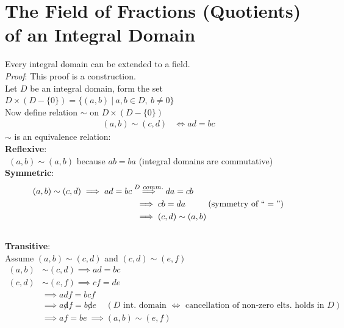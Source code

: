 \section{The Field of Fractions (Quotients) of an Integral Domain}
\begin{theorem}
    Every integral domain can be extended to a field. \\
    \textit{Proof}: This proof is a construction. \steezybreak \\
    Let $D$ be an integral domain, form the set $D\times (D-\{0\})=\{(a,b) \ | \ a,b\in D, \ b\neq 0\}$ \steezybreak \\
    Now define relation $\sim$ on $D\times (D-\{0\})$
    \begin{align}
        (a,b)\sim (c,d) &\iff ad=bc \nonumber
    \end{align}
    $\sim$ is an equivalence relation: \\
    \noindent \textbf{Reflexive}: \\ 
    \indent $\ \ (a,b)\sim (a,b)$ because $ab=ba$ (integral domains are commutative)\\
    \noindent \textbf{Symmetric}: 
    \begin{align}
        (a,b)\sim (c,d) \implies ad=bc &\overset{D \  comm.}{\implies} da=cb \nonumber \\
        & \ \implies cb=da \ \ \ \ \ \ \ \ (\text{symmetry of }``=") \nonumber \\
        & \ \implies (c,d)\sim (a,b) \nonumber
    \end{align} \\
    \noindent \textbf{Transitive}: \\
    Assume $(a,b)\sim (c,d)$ and $(c,d)\sim (e,f)$
    \begin{align}
        (a,b)&\sim (c,d) \implies ad=bc \nonumber \\
        (c,d)&\sim (e,f) \implies cf=de \nonumber \\
        &\implies adf= bcf \nonumber \\
        &\implies a\not d f = b\not d e  \ \ \ \ \ (D \text{ int. domain }\iff \text{ cancellation of non-zero elts. holds in }D)\nonumber \\
        &\implies af=be \ \implies (a,b)\sim (e,f) \nonumber
    \end{align}
    \\


\end{theorem}
